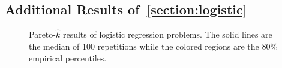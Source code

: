 
\subsection{Additional Results of~\cref{section:logistic}}

\begin{figure}[H]
  \centering
  \caption{Pareto-\(\widehat{k}\) results of logistic regression problems.
    The solid lines are the median of 100 repetitions while the colored regions are the 80\% empirical percentiles.
  }
\end{figure}


